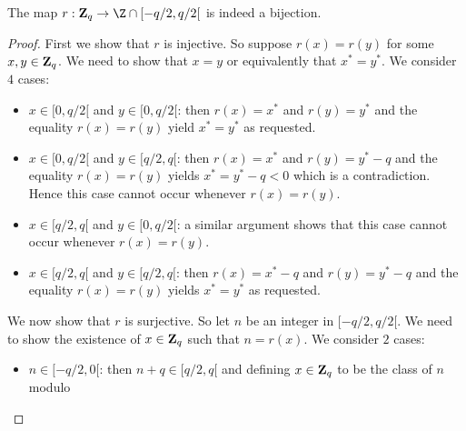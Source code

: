 \documentclass{article}
\newcommand{\zq}{\mbox{${\bf Z}_{q}$}}
\begin{document}
\begin{prop}
The map $r:\zq\rightarrow\Z\cap[-q/2,q/2[$ is indeed a bijection.
\end{prop}
\begin{proof}
First we show that $r$ is injective. So suppose $r(x)=r(y)$ for some 
$x,y\in\zq$. We need to show that $x=y$ or equivalently that 
$x^{*}=y^{*}$. We consider $4$ cases:
  \begin{itemize}
    \item $x\in[0,q/2[$ and $y\in[0,q/2[$: then $r(x)=x^{*}$ and $r(y)=y^{*}$
      and the equality $r(x)=r(y)$ yield $x^{*}=y^{*}$ as requested.
    \item $x\in[0,q/2[$ and $y\in[q/2,q[$: then $r(x)=x^{*}$ and 
      $r(y)=y^{*}-q$ and the equality $r(x) = r(y)$ yields $x^{*}=y^{*}-q < 0$
      which is a contradiction. Hence this case cannot occur whenever 
      $r(x)=r(y)$.
    \item $x\in[q/2,q[$ and $y\in[0,q/2[$: a similar argument shows that this
      case cannot occur whenever $r(x)=r(y)$.
    \item $x\in[q/2,q[$ and $y\in[q/2,q[$: then $r(x)=x^{*}-q$ and 
      $r(y)=y^{*}-q$ and the equality $r(x)=r(y)$ yields $x^{*}=y^{*}$ as 
      requested.
  \end{itemize}
We now show that $r$ is surjective. So let $n$ be an integer in $[-q/2,q/2[$.
  We need to show the existence of $x\in\zq$ such that $n=r(x)$. We consider
  $2$ cases:
  \begin{itemize}
    \item $n\in[-q/2,0[$: then $n+q\in[q/2,q[$ and defining $x\in\zq$ to be
      the class of $n$ modulo
  \end{itemize}
 
\end{proof}
\end{document}
